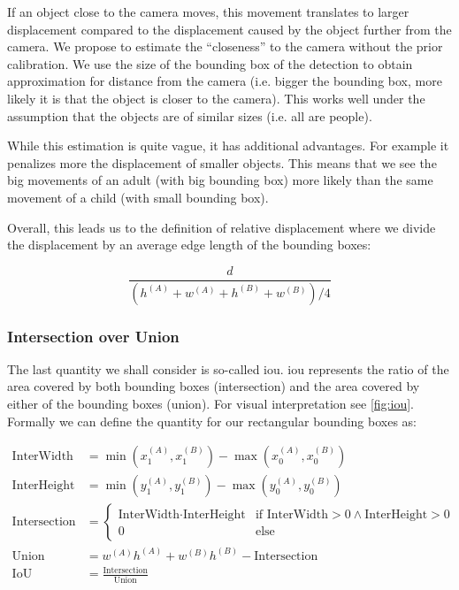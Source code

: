 If an object close to the camera moves, this movement translates to larger displacement compared to the displacement caused by the object further from the camera. We propose to estimate the ``closeness'' to the camera without the prior calibration. We use the size of the bounding box of the detection to obtain approximation for distance from the camera (i.e. bigger the bounding box, more likely it is that the object is closer to the camera). This works well under the assumption that the objects are of similar sizes (i.e. all are people).

While this estimation is quite vague, it has additional advantages. For example it penalizes more the displacement of smaller objects. This means that we see the big movements of an adult (with big bounding box) more likely than the same movement of a child (with small bounding box).

Overall, this leads us to the definition of relative displacement where we divide the displacement by an average edge length of the bounding boxes:

$$\frac{d}{\left(h^{(A)} + w^{(A)} + h^{(B)} + w^{(B)}\right) / 4}$$

\subsubsection{Intersection over Union}

The last quantity we shall consider is so-called \gls{iou}. \Gls{iou} represents the ratio of the area covered by both bounding boxes (intersection) and the area covered by either of the bounding boxes (union). For visual interpretation see \autoref{fig:iou}. Formally we can define the quantity for our rectangular bounding boxes as:

\begin{align*}
    \text{InterWidth} &= \min\left(x_1^{(A)}, x_1^{(B)}\right) - \max\left(x_0^{(A)}, x_0^{(B)}\right) \\
    \text{InterHeight} &= \min\left(y_1^{(A)}, y_1^{(B)}\right) - \max\left(y_0^{(A)}, y_0^{(B)}\right) \\
    \text{Intersection} &= \begin{cases}\text{InterWidth} \cdot \text{InterHeight} & \text{if InterWidth} > 0 \land \text{InterHeight} > 0 \\ 0 & \text{else}\end{cases} \\
    \text{Union} &= w^{(A)} h^{(A)} + w^{(B)} h^{(B)} - \text{Intersection} \\
    \text{IoU} &= \frac{\text{Intersection}}{\text{Union}}
\end{align*}

